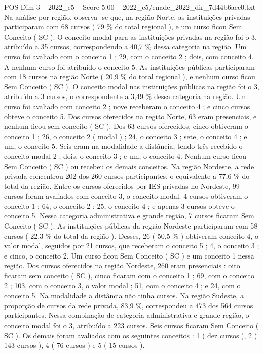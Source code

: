 \begin{textsample}{POS Dim 3 – 2022\_c5 – Score 5.00 – 2022\_c5/enade\_2022\_dir\_7d44b6aec0.txt}
Na análise por região, observa -se que, na região Norte, as instituições privadas participaram com 68 cursos ( 79 \% do total regional ), e um curso ficou Sem Conceito ( SC ).
O conceito modal para as instituições privadas na região foi o 3, atribuído a 35 cursos, correspondendo a 40,7 \% dessa categoria na região.
Um curso foi avaliado com o conceito 1 ; 29, com o conceito 2 ; dois, com conceito 4.
A nenhum curso foi atribuído o conceito 5.
As instituições públicas participaram com 18 cursos na região Norte ( 20,9 \% do total regional ), e nenhum curso ficou Sem Conceito ( SC ).
O conceito modal nas instituições públicas na região foi o 3, atribuído a 3 cursos, o correspondente a 3,49 \% dessa categoria na região.
Um curso foi avaliado com conceito 2 ; nove receberam o conceito 4 ; e cinco cursos obteve o conceito 5.
Dos cursos oferecidos na região Norte, 63 eram presenciais, e nenhum ficou sem conceito ( SC ).
Dos 63 cursos oferecidos, cinco obtiveram o conceito 1 ; 26, o conceito 2 ( modal ) ; 24, o conceito 3 ; sete, o conceito 4 ; e um, o conceito 5.
Seis eram na modalidade a distância, tendo três recebido o conceito modal 2 ; dois, o conceito 3 ; e um, o conceito 4.
Nenhum curso ficou Sem Conceito ( SC ) ou recebeu os demais conceitos.
Na região Nordeste, a rede privada concentrou 202 dos 260 cursos participantes, o equivalente a 77,6 \% do total da região.
Entre os cursos oferecidos por IES privadas no Nordeste, 99 cursos foram avaliados com conceito 3, o conceito modal. 4 cursos obtiveram o conceito 1 ; 64, o conceito 2 ; 25, o conceito 4 ; e apenas 3 cursos obteve o conceito 5.
Nessa categoria administrativa e grande região, 7 cursos ficaram Sem Conceito ( SC ).
As instituições públicas da região Nordeste participaram com 58 cursos ( 22,3 \% do total da região ).
Desses, 26 ( 50,5 \% ) obtiveram conceito 4, o valor modal, seguidos por 21 cursos, que receberam o conceito 5 ; 4, o conceito 3 ; e cinco, o conceito 2.
Um curso ficou Sem Conceito ( SC ) e um conceito 1 nessa região.
Dos cursos oferecidos na região Nordeste, 260 eram presenciais : oito ficaram sem conceito ( SC ), cinco ficaram com o conceito 1 ; 69, com o conceito 2 ; 103, com o conceito 3, o valor modal ; 51, com o conceito 4 ; e 24, com o conceito 5.
Na modalidade a distância não tinha cursos.
Na região Sudeste, a proporção de cursos da rede privada, 83,9 \%, correspondeu a 473 dos 564 cursos participantes.
Nessa combinação de categoria administrativa e grande região, o conceito modal foi o 3, atribuído a 223 cursos.
Seis cursos ficaram Sem Conceito ( SC ).
Os demais foram avaliados com os seguintes conceitos : 1 ( dez cursos ), 2 ( 143 cursos ), 4 ( 76 cursos ) e 5 ( 15 cursos ).

\end{textsample}
